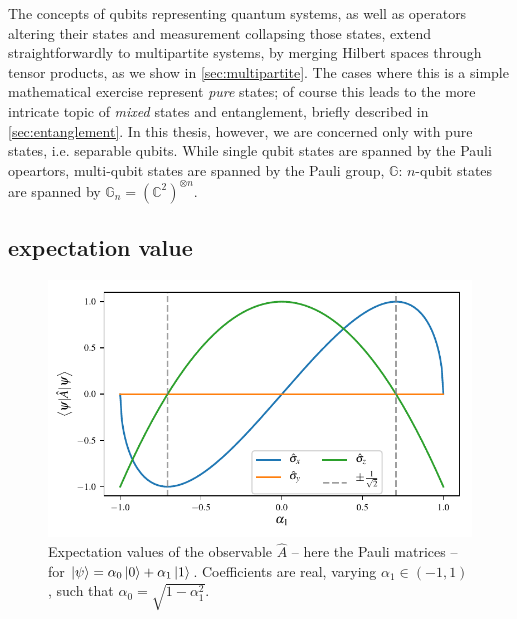 {The concepts of qubits representing quantum systems, as well as operators
    altering their states and measurement collapsing those states,
    extend straightforwardly to multipartite systems, by merging Hilbert spaces through tensor products, 
    as we show in \cref{sec:multipartite}. 
The cases where this is a simple mathematical exercise represent \emph{pure} states;
    of course this leads to the more intricate topic of \emph{mixed} states and entanglement, 
    briefly described in \cref{sec:entanglement}.
In this thesis, however, we are concerned only with pure states, i.e. separable qubits.
While single qubit states are spanned by the Pauli opeartors, multi-qubit states are spanned by the Pauli group, $\mathbb{G}$: 
    $n$-qubit states are spanned by $\mathbb{G}_n = \left(\mathbb{C}^2\right)^{\otimes n}$.

\subsection{\Gls{expectation value}}\label{sec:expectation_value}
\begin{figure}
    \label{fig:expectation_values}
    \begin{center}
        \includegraphics{contextual_review/figures/expectation_values.pdf}
    \end{center}
    \caption[Expectation values]{
        Expectation values of the observable $\hat{A}$ -- here the Pauli matrices --  
            for $\ket{\psi} = \alpha_0 \ket{0} + \alpha_1 \ket{1}$.
            Coefficients are real, varying $\alpha_1 \in \left( -1, 1\right)$, such that $\alpha_0 = \sqrt{1 - \alpha_1^2}$. 
    }
\end{figure}

}
